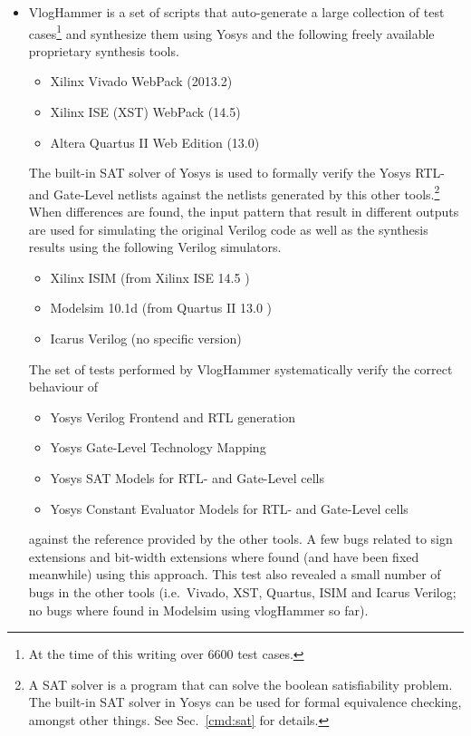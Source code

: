 \begin{itemize}
\item VlogHammer  is a set of scripts that
auto-generate a large collection of test cases\footnote{At the time of this
writing over 6600 test cases.} and synthesize them using Yosys and the
following freely available proprietary synthesis tools.
\begin{itemize}
\item Xilinx Vivado WebPack (2013.2) 
\item Xilinx ISE (XST) WebPack (14.5) 
\item Altera Quartus II Web Edition (13.0) 
\end{itemize}
The built-in SAT solver of Yosys is used to formally
verify the Yosys RTL- and Gate-Level netlists against the netlists generated by
this other tools.\footnote{A SAT solver is a program that can solve the boolean
satisfiability problem. The built-in SAT solver in Yosys can be used for formal
equivalence checking, amongst other things. See Sec.~\ref{cmd:sat} for details.}
When differences are found, the input pattern that result in
different outputs are used for simulating the original Verilog code as well as
the synthesis results using the following Verilog simulators.
\begin{itemize}
\item Xilinx ISIM (from Xilinx ISE 14.5 )
\item Modelsim 10.1d (from Quartus II 13.0 )
\item Icarus Verilog (no specific version)
\end{itemize}
The set of tests performed by VlogHammer systematically verify the correct
behaviour of
\begin{itemize}
\item Yosys Verilog Frontend and RTL generation
\item Yosys Gate-Level Technology Mapping
\item Yosys SAT Models for RTL- and Gate-Level cells
\item Yosys Constant Evaluator Models for RTL- and Gate-Level cells
\end{itemize}
against the reference provided by the other tools. A few bugs related to sign
extensions and bit-width extensions where found (and have been fixed meanwhile)
using this approach. This test also revealed a small number of bugs in the
other tools (i.e.~Vivado, XST, Quartus, ISIM and Icarus Verilog; no bugs where
found in Modelsim using vlogHammer so far).
\end{itemize}

